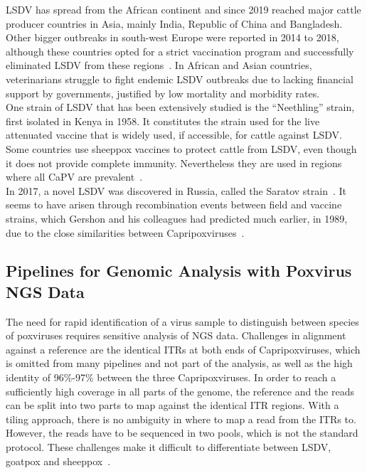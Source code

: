 \ac{LSDV} has spread from the African continent and since 2019 reached major cattle producer countries in Asia, mainly India, Republic of China and Bangladesh. Other bigger outbreaks in south-west Europe were reported in 2014 to 2018, although these countries opted for a strict vaccination program and successfully eliminated \ac{LSDV} from these regions~\cite{prevention2017control}. In African and Asian countries, veterinarians struggle to fight endemic \ac{LSDV} outbreaks due to lacking financial support by governments, justified by low mortality and morbidity rates. \\
One strain of \ac{LSDV} that has been extensively studied is the ``Neethling'' strain, first isolated in Kenya in 1958. It constitutes the strain used for the live attenuated vaccine that is widely used, if accessible, for cattle against \ac{LSDV}. Some countries use sheeppox vaccines to protect cattle from \ac{LSDV}, even though it does not provide complete immunity. Nevertheless they are used in regions where all \acs{CaPV} are prevalent~\cite{brenner2009appearance}. \\
In 2017, a novel \ac{LSDV} was discovered in Russia, called the Saratov strain~\cite{sprygin2018analysis}. It seems to have arisen through recombination events between field and vaccine strains, which Gershon and his colleagues had predicted much earlier, in 1989, due to the close similarities between Capripoxviruses~\cite{gershon1989poxvirus}. 

\subsection{Pipelines for Genomic Analysis with Poxvirus NGS Data}\label{sec:2-pox-pipelines}
The need for rapid identification of a virus sample to distinguish between species of poxviruses requires sensitive analysis of \ac{NGS} data. Challenges in alignment against a reference are the identical \acp{ITR} at both ends of Capripoxviruses, which is omitted from many pipelines and not part of the analysis, as well as the high identity of 96\%-97\% between the three Capripoxviruses. In order to reach a sufficiently high coverage in all parts of the genome, the reference and the reads can be split into two parts to map against the identical \ac{ITR} regions. With a tiling approach, there is no ambiguity in where to map a read from the \acp{ITR} to. However, the reads have to be sequenced in two pools, which is not the standard protocol. These challenges make it difficult to differentiate between \ac{LSDV}, goatpox and sheeppox~\cite{tulman2001genome}.

